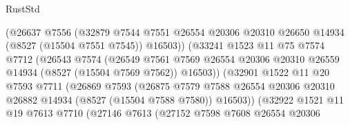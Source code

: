 \begin{lexlean}{RustStd}
\begin{coremodule}
                              (@26637
                                @7556
                                (@32879
                                  @7544
                                  @7551
                                  @26554
                                  @20306
                                  @20310
                                  @26650
                                  @14934
                                  (@8527 (@15504 @7551 @7545))
                                  @16503))
                              (@33241
                                @1523
                                @11
                                @75
                                @7574
                                @7712
                                (@26543
                                  @7574
                                  (@26549
                                    @7561
                                    @7569
                                    @26554
                                    @20306
                                    @20310
                                    @26559
                                    @14934
                                    (@8527 (@15504 @7569 @7562))
                                    @16503))
                                (@32901
                                  @1522
                                  @11
                                  @20
                                  @7593
                                  @7711
                                  (@26869
                                    @7593
                                    (@26875
                                      @7579
                                      @7588
                                      @26554
                                      @20306
                                      @20310
                                      @26882
                                      @14934
                                      (@8527 (@15504 @7588 @7580))
                                      @16503))
                                  (@32922
                                    @1521
                                    @11
                                    @19
                                    @7613
                                    @7710
                                    (@27146
                                      @7613
                                      (@27152
                                        @7598
                                        @7608
                                        @26554
                                        @20306

\end{coremodule}
\end{lexlean}
